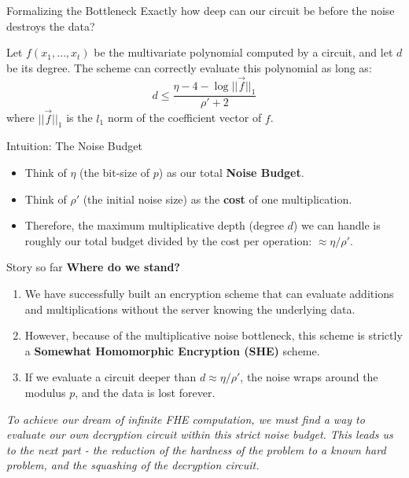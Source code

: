 \documentclass[10pt,handout]{beamer}
\begin{document}
\begin{frame}{Formalizing the Bottleneck}
    Exactly how deep can our circuit be before the noise destroys the data?
    \pause
    
    \begin{lemma}
    Let $f(x_1, \dots, x_t)$ be the multivariate polynomial computed by a circuit, and let $d$ be its degree. The scheme can correctly evaluate this polynomial as long as:
    $$d \le \frac{\eta - 4 - \log||\vec{f}||_1}{\rho' + 2}$$
    where $||\vec{f}||_1$ is the $l_1$ norm of the coefficient vector of $f$.
    \end{lemma}
    \pause
    
    \begin{block}{Intuition: The Noise Budget}
    \begin{itemize}
        \item Think of $\eta$ (the bit-size of $p$) as our total \textbf{Noise Budget}.
        \item Think of $\rho'$ (the initial noise size) as the \textbf{cost} of one multiplication.
        \item Therefore, the maximum multiplicative depth (degree $d$) we can handle is roughly our total budget divided by the cost per operation: $\approx \eta / \rho'$.
    \end{itemize}
    \end{block}
\end{frame}

\begin{frame}{Story so far}
    \textbf{Where do we stand?}
    \pause
    
    \begin{enumerate}
        \item We have successfully built an encryption scheme that can evaluate additions and multiplications without the server knowing the underlying data.
        \pause
        \item However, because of the multiplicative noise bottleneck, this scheme is strictly a \textbf{Somewhat Homomorphic Encryption (SHE)} scheme.
        \pause
        \item If we evaluate a circuit deeper than $d \approx \eta / \rho'$, the noise wraps around the modulus $p$, and the data is lost forever.
    \end{enumerate}
    \pause
    
    \vspace{0.5cm}
    \begin{center}
        \textit{To achieve our dream of infinite FHE computation, we must find a way to evaluate our own decryption circuit within this strict noise budget. This leads us to the next part - the reduction of the hardness of the problem to a known hard problem, and the squashing of the decryption circuit.}
    \end{center}
\end{frame}
\end{document}
